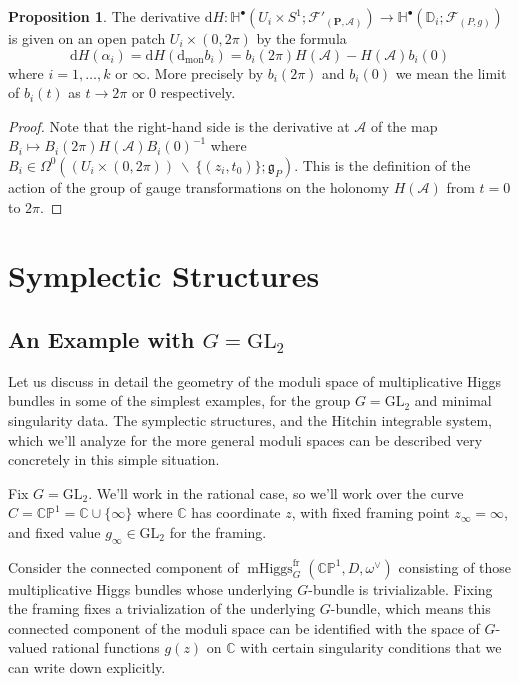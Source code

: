 \documentclass[11pt, oneside, reqno]{amsart}
\theoremstyle{definition} \newtheorem{definition}{Definition}[section]
\newtheorem{prop}[definition]{Proposition}
\theoremstyle{definition} \newtheorem{remark}[definition]{Remark}
\theoremstyle{definition} \newtheorem{remarks}[definition]{Remarks}
\theoremstyle{definition} \newtheorem{question}[definition]{Question}
\theoremstyle{definition} \newtheorem*{note}{Note}
\theoremstyle{definition} \newtheorem{example}[definition]{Example}
\theoremstyle{definition} \newtheorem{examples}[definition]{Examples}
\renewcommand{\gg}{\mathfrak{g}}
\newcommand{\bb}[1]{\mathbb{#1}}
\newcommand{\mr}[1]{\mathrm{#1}}
\newcommand{\mc}[1]{\mathcal{#1}}
\newcommand{\bo}[1]{\boldsymbol{#1}}
\newcommand{\bs}{\ \backslash \ }
\newcommand{\CC}{\mathbb{C}}
\newcommand{\GL}{\mathrm{GL}}
\DeclareMathOperator{\mhiggs}{mHiggs}
\renewcommand{\d}{\mathrm{d}}
\newcommand{\fr}{\mathrm{fr}}
\begin{document}
\begin{prop} \label{local_derivative_description_prop}
The derivative $\d H \colon \bb H^\bullet(U_i \times S^1 ; \mc F'_{(\bo P,\mc A)}) \to \bb H^\bullet(\bb D_i; \mc F_{(P,g)})$ is given on an open patch $U_i \times (0,2\pi)$ by the formula
\[\d H(\alpha_i) = \d H(\d_{\mr{mon}} b_i) = b_i(2\pi)H(\mc A) - H(\mc A)b_i(0)\]
where $i = 1, \ldots, k$ or $\infty$.  More precisely by $b_i(2\pi)$ and $b_i(0)$ we mean the limit of $b_i(t)$ as $t \to 2\pi$ or 0 respectively.
\end{prop}

\begin{proof}
Note that the right-hand side is the derivative at $\mc A$ of the map $B_i \mapsto B_i(2\pi)H(\mc A)B_i(0)^{-1}$ where $B_i \in \Omega^0((U_i \times (0,2\pi)) \bs \{(z_i, t_0)\}; \gg_P)$.  This is the definition of the action of the group of gauge transformations on the holonomy $H(\mc A)$ from $t=0$ to $2\pi$.
\end{proof}

\section{Symplectic Structures} \label{symp_section}
\subsection{An Example with $G=\GL_2$} \label{GL2_example_section}

Let us discuss in detail the geometry of the moduli space of multiplicative Higgs bundles in some of the simplest examples, for the group $G = \GL_2$ and minimal singularity data.  The symplectic structures, and the Hitchin integrable system, which we'll analyze for the more general moduli spaces can be described very concretely in this simple situation. 

Fix $G=\GL_2$.  We'll work in the rational case, so we'll work over the curve $C = \bb{CP}^1 = \CC \cup \{\infty\}$ where $\CC$ has coordinate $z$, with fixed framing point $z_\infty = \infty$, and fixed value $g_\infty \in \GL_2$ for the framing. 

Consider the connected component of $\mhiggs^\fr_{G}(\bb{CP}^1, D, \omega^{\vee})$ consisting of those multiplicative Higgs bundles whose underlying $G$-bundle is trivializable.  Fixing the framing fixes a trivialization of the underlying $G$-bundle, which means this connected component of the moduli space can be identified with the space of $G$-valued
rational functions $g(z)$ on $\CC$ with certain singularity conditions that we can write down explicitly.
\end{document}
